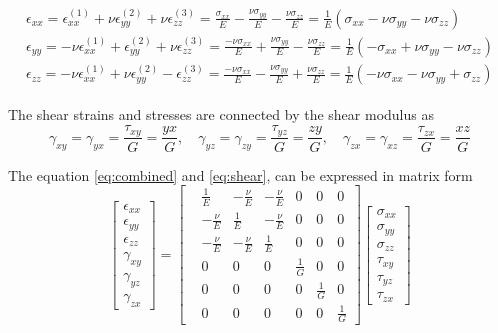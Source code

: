 \begin{align}
\begin{split}
\epsilon_{xx} = \epsilon^{(1)}_{xx} + \nu\epsilon^{(2)}_{yy} + \nu\epsilon^{(3)}_{zz} = \frac{\sigma_{xx}}{E} - \frac{\nu\sigma_{yy}}{E} - \frac{\nu\sigma_{zz}}{E} = \frac{1}{E}(\sigma_{xx} - \nu\sigma_{yy} - \nu\sigma_{zz})\\
\epsilon_{yy} = -\nu\epsilon^{(1)}_{xx} + \epsilon^{(2)}_{yy} + \nu\epsilon^{(3)}_{zz} = \frac{-\nu\sigma_{xx}}{E} + \frac{\nu\sigma_{yy}}{E} - \frac{\nu\sigma_{zz}}{E} = \frac{1}{E}(-\sigma_{xx} + \nu\sigma_{yy} - \nu\sigma_{zz})\\
\epsilon_{zz} = -\nu\epsilon^{(1)}_{xx} + \nu\epsilon^{(2)}_{yy} - \epsilon^{(3)}_{zz} = \frac{-\nu\sigma_{xx}}{E} - \frac{\nu\sigma_{yy}}{E} + \frac{\nu\sigma_{zz}}{E} = \frac{1}{E}(-\nu\sigma_{xx} - \nu\sigma_{yy} + \sigma_{zz})
\end{split}
\label{eq:combined}
\end{align}

The shear strains and stresses are connected by the shear modulus as
\begin{equation}
\gamma_{xy} = \gamma_{yx} = \frac{\tau_{xy}}{G} = \frac{yx}{G}, \quad 
\gamma_{yz} = \gamma_{zy} = \frac{\tau_{yz}}{G} = \frac{zy}{G}, \quad
\gamma_{zx} = \gamma_{xz} = \frac{\tau_{zx}}{G} = \frac{xz}{G}
\label{eq:shear}
\end{equation}

The equation \ref{eq:combined} and \ref{eq:shear}, can be expressed in matrix form
\begin{equation}
\begin{bmatrix}
\epsilon_{xx}\\ 
\epsilon_{yy}\\ 
\epsilon_{zz}\\ 
\gamma_{xy}\\ 
\gamma_{yz}\\
\gamma_{zx} 
\end{bmatrix}
=
\begin{bmatrix}
 &\frac{1}{E}  &-\frac{\nu}{E}  &-\frac{\nu}{E}  &0  &0  &0 \\ 
 &-\frac{\nu}{E}  &\frac{1}{E}  &-\frac{\nu}{E}  &0  &0 &0 \\ 
 &-\frac{\nu}{E}  &-\frac{\nu}{E}  &\frac{1}{E}  &0  &0 &0 \\ 
 &0  &0  &0  &\frac{1}{G}  &0 &0 \\
 &0  &0  &0  &0  &\frac{1}{G} &0 \\ 
 &0  &0  &0  &0  &0 &\frac{1}{G}
\end{bmatrix}
\begin{bmatrix}
\sigma_{xx}\\ 
\sigma_{yy}\\ 
\sigma_{zz}\\ 
\tau_{xy}\\ 
\tau_{yz}\\
\tau_{zx} 
\end{bmatrix}
\label{eq:matrixform}
\end{equation}


